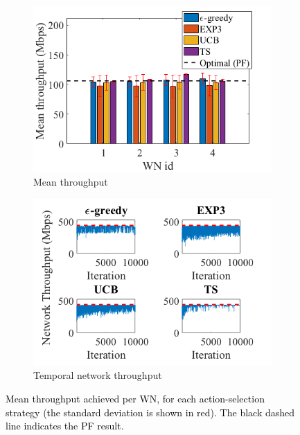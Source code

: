 \documentclass{article}
\begin{document}
	\begin{figure}[h!]
		\centering
		\begin{subfigure}[b]{0.45\textwidth}
			\includegraphics[width=\textwidth]{images/results_part_1_mean_tpt_default}
			\caption{Mean throughput}
			\label{fig:results_part_1_variability_default}
		\end{subfigure}
		\begin{subfigure}[b]{0.45\textwidth}
			\includegraphics[width=\textwidth]{images/results_part_1_agg_variability_default}
			\caption{Temporal network throughput}
			\label{fig:results_part_1_agg_variability_default}
		\end{subfigure}
		\caption{\textcolor{black}{Mean throughput achieved per WN, for each action-selection strategy (the standard deviation is shown in red). The black dashed line indicates the PF result.}}
		\label{fig:results_part_1_mean_tpt}
	\end{figure}
	
\end{document}
